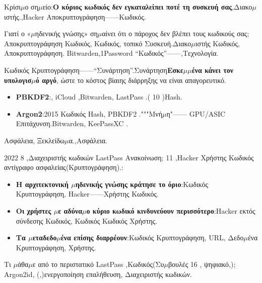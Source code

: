 Κρίσι$\mu$ο ση$\mu$είο:\textbf{Ο κύριος κωδικός δεν εγκαταλείπει ποτέ τη συσκευή σας},Διακο$\mu$ιστής.,Hacker Αποκρυπτογράφηση——Κωδικός.

\begin{tcbinfo}{Γιατί ο «$\mu$ηδενικής γνώσης» ση$\mu$αίνει ότι ο πάροχος δεν βλέπει τους κωδικούς σας;}
Αποκρυπτογράφηση Κωδικός, Κωδικός, τοπικό Συσκευή.Διακο$\mu$ιστής Κωδικός, Αποκρυπτογράφηση. Bitwarden,1Password “Κωδικός”——,Τεχνολογία.

\end{tcbinfo}


Κωδικός Κρυπτογράφηση——“Συνάρτηση”.Συνάρτηση\textbf{Εσκε$\mu$$\mu$ένα κάνει τον υπολογισ$\mu$ό αργό}, ώστε το κόστος βίαιης διάρρηξης να είναι απαγορευτικό.

\begin{itemize}
  \item \textbf{PBKDF2}:, iCloud ,Bitwarden, LastPass .( 10 )Hash.
  \item \textbf{Argon2}:2015 Κωδικός Hash, PBKDF2 ."""Μνή$\mu$η"—— GPU/ASIC Επιτάχυνση.Bitwarden, KeePassXC .
\end{itemize}

Ασφάλεια, Ξεκλείδω$\mu$α.,Ασφάλεια.


2022 8 ,Διαχειριστής κωδικών LastPass Ανακοίνωση; 11 ,Hacker Χρήστης Κωδικός αντίγραφο ασφαλείας(Κρυπτογράφηση).:

\begin{itemize}
  \item \textbf{Η αρχιτεκτονική $\mu$ηδενικής γνώσης κράτησε το όριο}:Κωδικός Κρυπτογράφηση, Hacker——Χρήστης Κωδικός.
  \item \textbf{Οι χρήστες $\mu$ε αδύνα$\mu$ο κύριο κωδικό κινδυνεύουν περισσότερο}:Hacker εκτός σύνδεσης Κωδικός, Κωδικός Κωδικός Χρήστης.
  \item \textbf{Τα $\mu$εταδεδο$\mu$ένα επίσης διαρρέουν}:Κωδικός Κρυπτογράφηση, URL, Δεδο$\mu$ένα Κρυπτογράφηση, Χρήστης.
\end{itemize}

\begin{tcbwarn}{Τι $\mu$άθα$\mu$ε από το περιστατικό LastPass}
,Κωδικός(Συ$\mu$βουλές 16 , ψηφιακό,); Argon2id, (,)ενεργοποίηση επαλήθευση, Διαχειριστής κωδικών.

\end{tcbwarn}


